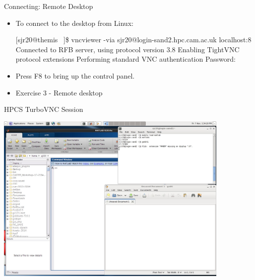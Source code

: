 \begin{frame}[fragile]{Connecting: Remote Desktop}
\begin{itemize}
\item To connect to the desktop from Linux:
\begin{semiverbatim}
\scriptsize
[sjr20@themis ~]\$ vncviewer -via sjr20@{\color<2->{red}login-sand2}.hpc.cam.ac.uk localhost:{8}
Connected to RFB server, using protocol version 3.8
Enabling TightVNC protocol extensions
Performing standard VNC authentication
Password:
\end{semiverbatim}
\smallskip
\item{\alert{Press F8 to bring up the control panel.}}
\pause
\item{Exercise 3 - Remote desktop}
\end{itemize}
\end{frame}

\begin{frame}{HPCS TurboVNC Session}
\begin{center}
\centerline{\includegraphics[width=0.85\textwidth]{imgs/linux-turbovnc.png}}
\end{center}
\end{frame}

